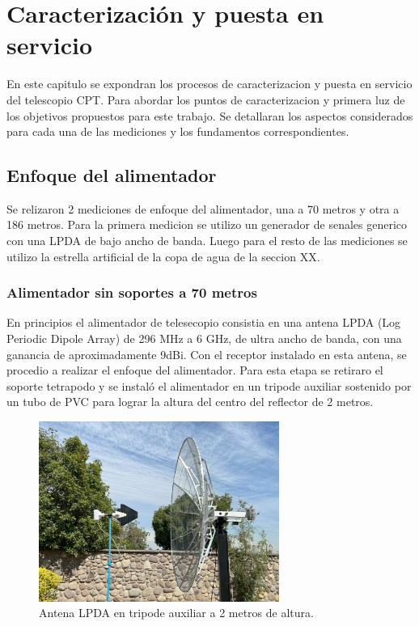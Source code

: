 \chapter{Caracterización y puesta en servicio}

En este capitulo se expondran los procesos de caracterizacion y puesta en servicio del telescopio CPT. Para abordar los puntos de caracterizacion y primera luz de los objetivos propuestos para este trabajo. Se detallaran los aspectos considerados para cada una de las mediciones y los fundamentos correspondientes.

\section{Enfoque del alimentador}

Se relizaron 2 mediciones de enfoque del alimentador, una a 70 metros y otra a 186 metros. Para la primera medicion se utilizo un generador de senales generico con una LPDA de bajo ancho de banda. Luego para el resto de las mediciones se utilizo la estrella artificial de la copa de agua de la seccion XX.\\

\subsection{Alimentador sin soportes a 70 metros}

En principios el alimentador de telesecopio consistia en una antena LPDA (Log Periodic Dipole Array) de 296 MHz a 6 GHz, de ultra ancho de banda, con una ganancia de aproximadamente 9dBi. Con el receptor instalado en esta antena, se procedio a realizar el enfoque del alimentador. Para esta etapa se retiraro el soporte tetrapodo y se instaló el alimentador en un tripode auxiliar sostenido por un tubo de PVC para lograr la altura del centro del reflector de 2 metros.\\

\begin{figure}
    \centering
    \includegraphics[width=0.7\textwidth]{img/enfoque1}
    \caption{Antena LPDA en tripode auxiliar a 2 metros de altura.}
    \label{fig:antena_lpda}
\end{figure}

